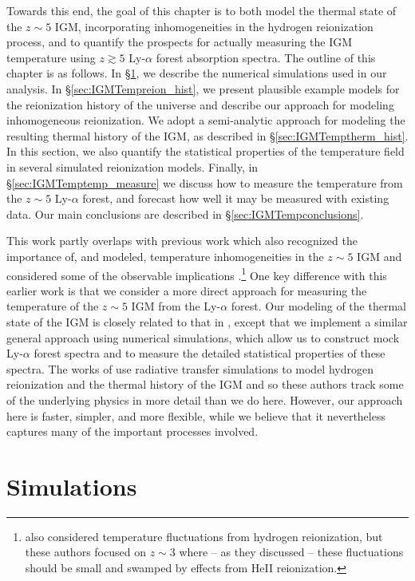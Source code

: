 Towards this end, the goal of this chapter is to both model the thermal state of the $z \sim 5$ IGM, incorporating inhomogeneities in
the hydrogen reionization process, and to quantify the prospects for actually measuring the IGM temperature using $z \gtrsim 5$ Ly-$\alpha$ forest absorption spectra. The outline of this chapter is as follows. In \S \ref{sec:IGMTempsims}, we describe
the numerical simulations used in our analysis. In \S \ref{sec:IGMTempreion_hist}, we present plausible example models for
the reionization history of the universe and describe our approach for modeling inhomogeneous reionization. We adopt a semi-analytic approach
for modeling the resulting thermal history of the IGM, as described in \S \ref{sec:IGMTemptherm_hist}. In this section, we also quantify
the statistical properties of the temperature field in several simulated reionization models.
 Finally, in \S \ref{sec:IGMTemptemp_measure} we discuss how to measure
the temperature from the $z \sim 5$ Ly-$\alpha$ forest, and forecast how well it may be measured with existing data. Our main conclusions
are described in \S \ref{sec:IGMTempconclusions}.

This work partly overlaps with previous work which also recognized the importance of, and modeled, temperature inhomogeneities in the $z \sim 5$ IGM
and considered some of the observable implications \citep{Trac:2008yz,Cen:2009bg,Furlanetto:2009kr}.\footnote{\citet{Lai:2005ha} also considered
temperature fluctuations from hydrogen reionization, but these authors focused on $z \sim 3$ where -- as they discussed -- these fluctuations should be small and swamped
by effects from HeII reionization.} One key difference with this earlier work is
that we consider a more direct approach for measuring the temperature of the $z \sim 5$ IGM from the Ly-$\alpha$ forest. Our modeling of
the thermal state of the IGM is closely related to that in \citet{Furlanetto:2009kr}, except that we implement a similar general approach
using numerical simulations, which allow us to construct mock Ly-$\alpha$ forest spectra and to measure the detailed statistical properties
of these spectra. The works of \citep{Trac:2008yz,Cen:2009bg} use radiative transfer simulations to model hydrogen reionization and the
thermal history of the IGM and so these authors track
some of the underlying physics in more detail than we do here. However, our approach here is faster, simpler, and more flexible, while we believe
that it nevertheless captures many of the important processes involved. 


\section{Simulations}
\label{sec:IGMTempsims}

